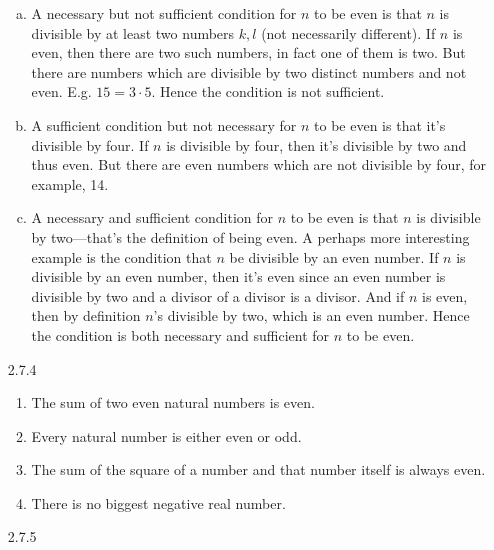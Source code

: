 \begin{enumerate}
			\begin{enumerate}[(a)]
			
				\item A necessary but not sufficient condition for $n$ to be even is that $n$ is divisible by at least two numbers $k,l$ (not necessarily different). If $n$ is even, then there are two such numbers, in fact one of them is two. But there are numbers which are divisible by two distinct numbers and not even. E.g. $15=3\cdot 5$. Hence the condition is not sufficient.  
				
				\item A sufficient condition but not necessary for $n$ to be even is that it's divisible by four. If $n$ is divisible by four, then it's divisible by two and thus even. But there are even numbers which are not divisible by four, for example, 14.
				
				\item A necessary and sufficient condition for $n$ to be even is that $n$ is divisible by two---that's the definition of being even. A perhaps more interesting example is the condition that $n$ be divisible by an even number. If $n$ is divisible by an even number, then it's even since an even number is divisible by two and a divisor of a divisor is a divisor. And if $n$ is even, then by definition $n$'s divisible by two, which is an even number. Hence the condition is both necessary and sufficient for $n$ to be even.
							
			\end{enumerate}
			
		\item[2.7.4]
		
			\begin{enumerate}
			
				\item The sum of two even natural numbers is even.
				
				\item Every natural number is either even or odd.
				
				\item The sum of the square of a number and that number itself is always even.
				
				\item There is no biggest negative real number.
			
			\end{enumerate}
			
			
		\item[2.7.5] 
		

\end{enumerate}
